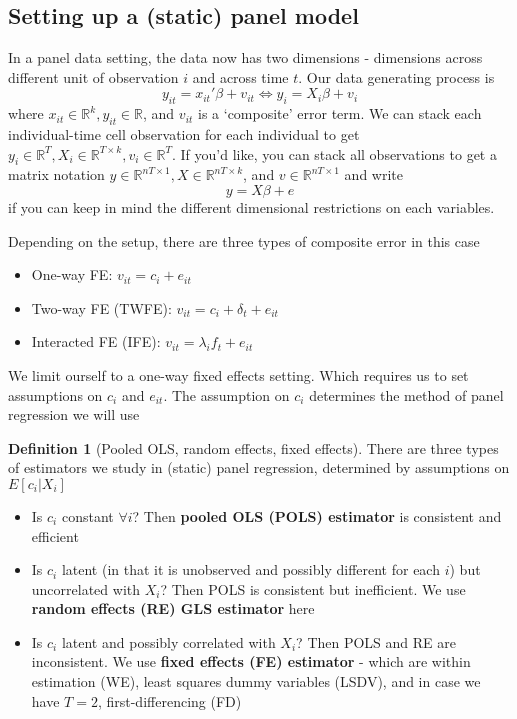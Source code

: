 \documentclass[12pt]{article}
\theoremstyle{definition}
\newtheorem{definition}{Definition}[section]
\theoremstyle{property}
\theoremstyle{assumption}
\theoremstyle{example}
\theoremstyle{comment}
\begin{document}
\subsection{Setting up a (static) panel model}
In a panel data setting, the data now has two dimensions - dimensions across different unit of observation $i$ and across time $t$. 
Our data generating process is
\[
y_{it}= x_{it}'\beta+ v_{it} \iff y_i = X_i\beta+v_i
\]
where $x_{it}\in\mathbb{R}^k, y_{it}\in\mathbb{R}$, and $v_{it}$ is a `composite' error term. We can stack each individual-time cell observation for each individual to get $y_i \in\mathbb{R}^T, X_i \in\mathbb{R}^{T\times k}, v_i \in\mathbb{R}^T$. If you'd like, you can stack all observations to get a matrix notation $y\in\mathbb{R}^{nT\times 1},X\in\mathbb{R}^{nT\times k}$, and $v\in\mathbb{R}^{nT\times 1}$  and write
\[
y=X\beta+e
\]
if you can keep in mind the different dimensional restrictions on each variables. 
\par
Depending on the setup, there are three types of composite error in this case
\begin{itemize}
\item One-way FE: $v_{it}= c_i + e_{it}$
\item Two-way FE (TWFE): $v_{it}= c_i + \delta_t + e_{it}$
\item Interacted FE (IFE): $v_{it}= \lambda_if_t + e_{it}$
\end{itemize}
We limit ourself to a one-way fixed effects setting. Which requires us to set assumptions on $c_i$ and $e_{it}$. The assumption on $c_i$ determines the method of panel regression we will use
\begin{mdframed}[backgroundcolor=blue!5] 
\begin{definition}[Pooled OLS, random effects, fixed effects]
There are three types of estimators we study in (static) panel regression, determined by assumptions on $E[c_i|X_i]$
\begin{itemize}
\item Is $c_i$ constant $\forall i$? Then \textbf{pooled OLS (POLS) estimator} is consistent and efficient
\item Is $c_i$ latent (in that it is unobserved and possibly different for each $i$) but uncorrelated with $X_i$? Then POLS is consistent but inefficient. We use \textbf{random effects (RE) GLS estimator} here
\item Is $c_i$ latent and possibly correlated with $X_i$? Then POLS and RE are inconsistent. We use \textbf{fixed effects (FE) estimator} - which are within estimation (WE), least squares dummy variables (LSDV), and in case we have $T=2$, first-differencing (FD)
\end{itemize} 
\end{definition}
\end{mdframed}
\end{document}

